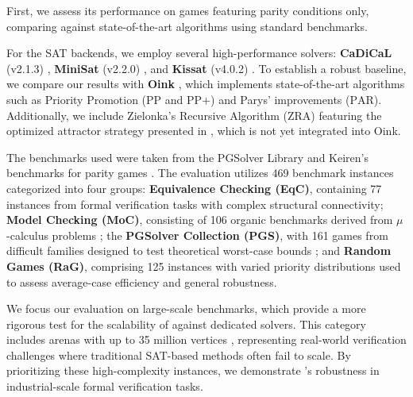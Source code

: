 \documentclass[a4paper,UKenglish,cleveref, autoref, thm-restate, anonymous]{lipics-v2021}
\begin{document}
First, we assess its performance on games featuring parity conditions only, comparing \nocq against state-of-the-art algorithms using standard benchmarks.

For the SAT backends, we employ several high-performance solvers: \textbf{CaDiCaL} (v2.1.3) \cite{Biere:Kissat:2024}, \textbf{MiniSat} (v2.2.0) \cite{Een:MiniSat:2003}, and \textbf{Kissat} (v4.0.2) \cite{Biere:Kissat:2024}. To establish a robust baseline, we compare our results with \textbf{Oink} \cite{vanDijk:2018}, which implements state-of-the-art algorithms such as Priority Promotion ($\text{PP}$ and $\text{PP+}$) and Parys' improvements ($\text{PAR}$). Additionally, we include Zielonka's Recursive Algorithm ($\text{ZRA}$) featuring the optimized attractor strategy presented in \cite{Aggarwal:2023}, which is not yet integrated into Oink.

The benchmarks used were taken from the PGSolver Library \cite{Friedmann:2017} and Keiren's benchmarks for parity games \cite{Keiren:2015}. The evaluation utilizes 469 benchmark instances categorized into four groups: \textbf{Equivalence Checking (EqC)}, containing 77 instances from formal verification tasks with complex structural connectivity; \textbf{Model Checking (MoC)}, consisting of 106 organic benchmarks derived from $\mu$-calculus problems ; the \textbf{PGSolver Collection (PGS)}, with 161 games from difficult families designed to test theoretical worst-case bounds ; and \textbf{Random Games (RaG)}, comprising 125 instances with varied priority distributions used to assess average-case efficiency and general robustness.

We focus our evaluation on large-scale benchmarks, which provide a more rigorous test for the scalability of \nocq against dedicated solvers. This category includes arenas with up to 35 million vertices , representing real-world verification challenges where traditional SAT-based methods often fail to scale. By prioritizing these high-complexity instances, we demonstrate \nocq's robustness in industrial-scale formal verification tasks.
\end{document}
